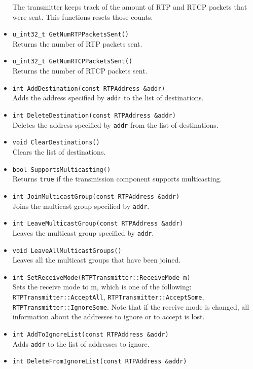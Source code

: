 \documentclass[12pt,a4paper]{article}
\begin{document}
\begin{itemize}
						The transmitter keeps track of the amount of RTP and RTCP 
						packets that were sent. This functions resets those counts.
					\item {\tt u\_int32\_t GetNumRTPPacketsSent()}\\
						Returns the number of RTP packets sent.
					\item {\tt u\_int32\_t GetNumRTCPPacketsSent()}\\
						Returns the number of RTCP packets sent.
					\item {\tt int AddDestination(const RTPAddress \&addr)}\\
						Adds the address specified by {\tt addr} to the list of
						destinations.
					\item {\tt int DeleteDestination(const RTPAddress \&addr)}\\
						Deletes the address specified by {\tt addr} from the list
						of destinations.
					\item {\tt void ClearDestinations()}\\
						Clears the list of destinations.
					\item {\tt bool SupportsMulticasting()}\\
						Returns {\tt true} if the transmission component supports
						multicasting.
					\item {\tt int JoinMulticastGroup(const RTPAddress \&addr)}\\
						Joins the multicast group specified by {\tt addr}.
					\item {\tt int LeaveMulticastGroup(const RTPAddress \&addr)}\\
						Leaves the multicast group specified by {\tt addr}.
					\item {\tt void LeaveAllMulticastGroups()}\\
						Leaves all the multicast groups that have been joined.
					\item {\tt int SetReceiveMode(RTPTransmitter::ReceiveMode m)}\\
						Sets the receive mode to m, which is one of the following:
						{\tt RTPTrans\-mitter::\-Accept\-All}, {\tt RTPTrans\-mitter::\-Accept\-Some},
						{\tt RTPTrans\-mitter::\-Ignore\-Some}. Note that if the receive
						mode is changed, all information about the addresses to ignore
						or to accept is lost.
					\item {\tt int AddToIgnoreList(const RTPAddress \&addr)}\\
						Adds {\tt addr} to the list of addresses to ignore.
					\item {\tt int DeleteFromIgnoreList(const RTPAddress \&addr)}\\

\end{itemize}
\end{document}
